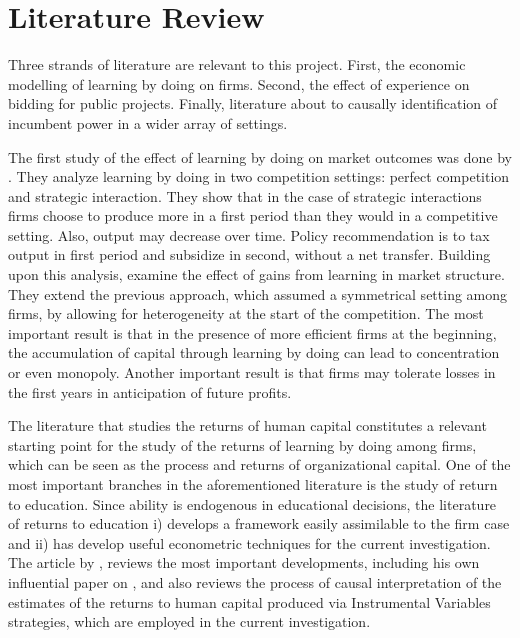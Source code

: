 \chapter{Literature Review}

Three strands of literature are relevant to this project. First, the economic modelling of learning by doing on firms. Second, the effect of experience on bidding for public projects. Finally, literature about to causally identification of incumbent power in a wider array of settings.

The first study of the effect of learning by doing on market outcomes was done by \citep{fudenberg1983learning} . They analyze learning by doing in two competition settings: perfect competition and strategic interaction. They show that in the case of strategic interactions firms choose to produce more in a first period than they would in a competitive setting. Also, output may decrease over time. Policy recommendation is to tax output in first period and subsidize in second, without a net transfer. Building upon this analysis, \citep{dasgupta1988learning} examine the effect of gains from learning in market structure. They extend the previous approach, which assumed a symmetrical setting among firms, by allowing for heterogeneity at the start of the competition. The most important result is that in the presence of more efficient firms at the beginning, the accumulation of capital through learning by doing can lead to concentration or even monopoly. Another important result is that firms may tolerate losses in the first years in anticipation of future profits.

The literature that studies the returns of human capital constitutes a relevant starting point for the study of the returns of learning by doing among firms, which can be seen as the process and returns of organizational capital. One of the most important branches in the aforementioned literature is the study of return to education. Since ability is endogenous in educational decisions, the literature of returns to education i) develops a framework easily assimilable to the firm case and ii) has develop useful econometric techniques for the current investigation. The article by \citep{card2001estimating}, reviews the most important developments, including his own influential paper on \citep{card1993using}, and also reviews the process of causal interpretation of the estimates of the returns to human capital produced via Instrumental Variables strategies, which are employed in the current investigation. 

